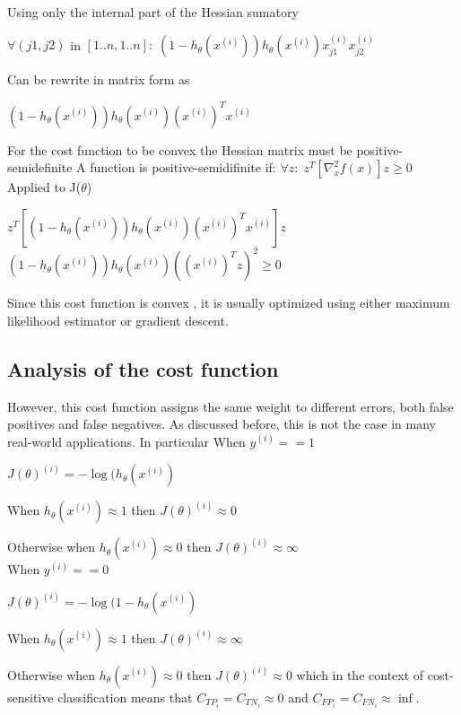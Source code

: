 	Using only the internal part of the Hessian sumatory
	
	\begin{center}
	$\forall (j1,j2)$ in $[1..n , 1..n] 
	:\; (1-h_\theta(x^{(i)}))h_\theta(x^{(i)})x_{j1}^{(i)}x_{j2}^{(i)} $
	\end{center}
	
	Can be rewrite in matrix form as
	
	\begin{center}
	$(1-h_\theta(x^{(i)}))h_\theta(x^{(i)})(x^{(i)})^Tx^{(i)} $
	\end{center}
	
	For the cost function to be convex the Hessian matrix
	must be positive-semidefinite
	A function is positive-semidifinite if:  $\forall z: \;{z^T}\left[\nabla
	_x^2f(x)\right]z \ge 0$\\ Applied to J($\theta$)
	\begin{center}
	$z^T \left[(1-h_\theta(x^{(i)}))h_\theta(x^{(i)})(x^{(i)})^Tx^{(i)} \right]z$\\
	$(1-h_\theta(x^{(i)}))h_\theta(x^{(i)})\left(( x^{(i)})^Tz\right)^2 \ge 0 $
	\end{center}
	
  Since this cost function is convex \citep{Murphy2012}, it is usually optimized using either 
  maximum likelihood estimator or gradient descent.	
	
	\subsection{Analysis of the cost function}
	However, this cost function assigns the same 
  weight to different errors, both false positives and false negatives. As discussed before, this 
  is not the case in many real-world applications. In particular
			\quad When  $y^{(i)}==1$
			
			\quad $J(\theta)^{(i)}=-\log(h_\theta(x^{(i)})$
			
			\quad When $h_\theta(x^{(i)})\approx1$ then $J(\theta)^{(i)}\approx0$
			
			\quad Otherwise when $h_\theta(x^{(i)})\approx0$ then
			$J(\theta)^{(i)}\approx\infty$ \\

			When $y^{(i)}==0$
			
			\quad $J(\theta)^{(i)}=-\log(1-h_\theta(x^{(i)})$
			
			\quad\quad When $h_\theta(x^{(i)})\approx1$ then
			$J(\theta)^{(i)}\approx\infty$ 

			\quad\quad Otherwise when $h_\theta(x^{(i)})\approx0$ then
			$J(\theta)^{(i)}\approx0$ 
  which in the context of cost-sensitive classification means that $C_{TP_i}=C_{TN_i}\approx 0$ and 
  $C_{FP_i}=C_{FN_i}\approx \inf$.
	
